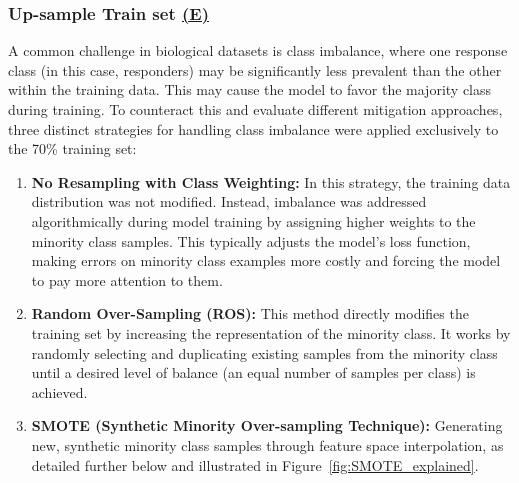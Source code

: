 \documentclass[12pt,a4paper]{report}
\begin{document}
\subsubsection*{Up-sample Train set \hyperref[fig:pipeline-1]{(E)}}
A common challenge in biological datasets is class imbalance, where one response class (in this case, responders) may be significantly less prevalent than the other within the training data. This may cause the model to favor the majority class during training. To counteract this and evaluate different mitigation approaches, three distinct strategies for handling class imbalance were applied exclusively to the 70\% training set:

\begin{enumerate}
    \item \textbf{No Resampling with Class Weighting:} In this strategy, the training data distribution was not modified. Instead, imbalance was addressed algorithmically during model training by assigning higher weights to the minority class samples. This typically adjusts the model's loss function, making errors on minority class examples more costly and forcing the model to pay more attention to them.
    \item \textbf{Random Over-Sampling (ROS):} This method directly modifies the training set by increasing the representation of the minority class. It works by randomly selecting and duplicating existing samples from the minority class until a desired level of balance (an equal number of samples per class) is achieved.
    \item \textbf{SMOTE (Synthetic Minority Over-sampling Technique):} Generating new, synthetic minority class samples through feature space interpolation, as detailed further below and illustrated in Figure~\ref{fig:SMOTE_explained}.
\end{enumerate}
\end{document}
